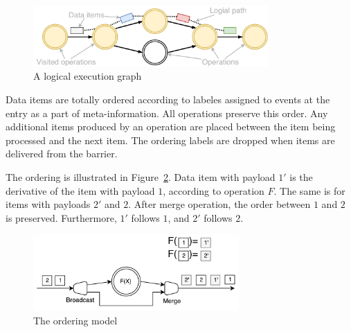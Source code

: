 
\begin{figure}[t]
  \centering
  \includegraphics[width=0.8\textwidth]{Chapters/DeterministicModelRuntime/pics/logical-graph.pdf}
  \caption{A logical execution  graph}
  \label{logical-graph-figure}
\end{figure}

Data items are totally ordered according to labeles assigned to events at the entry as a part of meta-information. All operations preserve this order. Any additional items produced by an operation are placed between the item being processed and the next item. The ordering labels are dropped when items are delivered from the barrier. 

The ordering is illustrated  in Figure~\ref{ordering}. Data item with payload $1'$ is the derivative of the item with payload $1$, according to operation $F$. The same is for items with payloads $2'$ and $2$. After merge operation, the order between $1$ and $2$ is preserved. Furthermore, $1'$ follows $1$, and $2'$ follows $2$.  

\begin{figure}[t]
  \centering
  \includegraphics[width=0.7\textwidth]{Chapters/DeterministicModelRuntime/pics/ordering}
  \caption{The ordering model}
  \label{ordering}
\end{figure}

